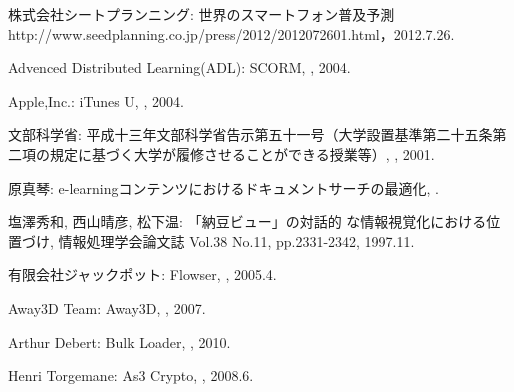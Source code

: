 \begin{bib}[100]


  株式会社シートプランニング:
  \newblock 世界のスマートフォン普及予測
  \newblock http://www.seedplanning.co.jp/press/2012/2012072601.html，2012.7.26.

  Advenced Distributed Learning(ADL):
  \newblock SCORM,
  , 2004.
  
  Apple,Inc.:
  \newblock iTunes U,
  , 2004. 
 
  文部科学省:
  \newblock 平成十三年文部科学省告示第五十一号（大学設置基準第二十五条第二項の規定に基づく大学が履修させることができる授業等）,
  , 2001.
  
  原真琴:
  \newblock e-learningコンテンツにおけるドキュメントサーチの最適化,
  .
  
  塩澤秀和, 西山晴彦, 松下温:
  \newblock 「納豆ビュー」の対話的 な情報視覚化における位置づけ,
  \newblock 情報処理学会論文誌 Vol.38 No.11, pp.2331-2342, 1997.11.
  
  有限会社ジャックポット:
  \newblock Flowser,
  , 2005.4.
  
  Away3D Team:
  \newblock Away3D,
  , 2007.
  
  Arthur Debert:
  \newblock Bulk Loader,
  , 2010.
  
  Henri Torgemane:
  \newblock As3 Crypto,
  , 2008.6.
  
\end{bib}